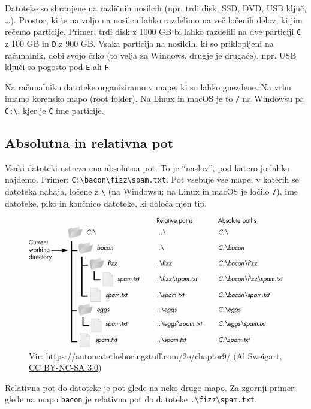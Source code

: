 \documentclass[
]{report}
\begin{document}
Datoteke so shranjene na različnih nosilcih (npr. trdi disk, SSD, DVD, USB ključ, \ldots). Prostor, ki je na voljo na nosilcu lahko razdelimo
na več ločenih delov, ki jim rečemo particije. Primer: trdi disk z
1000 GB bi lahko razdelili na dve particiji \texttt{C} z 100 GB in \texttt{D} z 900 GB. Vsaka
particija na nosilcih, ki so priklopljeni na računalnik, dobi svojo črko
(to velja za Windows, drugje je drugače), npr.
USB ključi so pogosto pod \texttt{E} ali \texttt{F}.

Na računalniku datoteke organiziramo v mape, ki so lahko gnezdene. Na vrhu
imamo korensko mapo (root folder). Na Linux in macOS je to \texttt{/} na Windowsu pa
\texttt{C:\textbackslash{}}, kjer je \texttt{C} ime particije.

\hypertarget{absolutna-in-relativna-pot}{%
\subsection{Absolutna in relativna pot}\label{absolutna-in-relativna-pot}}

Vsaki datoteki ustreza ena absolutna pot. To je ``naslov'', pod katero jo lahko najdemo. Primer: \texttt{C:\textbackslash{}bacon\textbackslash{}fizz\textbackslash{}spam.txt}. Pot vsebuje vse mape, v katerih se datoteka nahaja, ločene z \texttt{\textbackslash{}} (na Windowsu; na Linux in macOS je ločilo \texttt{/}), ime datoteke, piko in končnico datoteke, ki določa njen tip.

\begin{figure}
\centering
\includegraphics{./images/paths.jpeg}
\caption{Vir: \url{https://automatetheboringstuff.com/2e/chapter9/} (Al Sweigart, \href{https://creativecommons.org/licenses/by-nc-sa/3.0/}{CC BY-NC-SA 3.0})}
\end{figure}

Relativna pot do datoteke je pot glede na neko drugo mapo. Za zgornji primer:
glede na mapo \texttt{bacon} je relativna pot do datoteke \texttt{.\textbackslash{}fizz\textbackslash{}spam.txt}.
\end{document}
